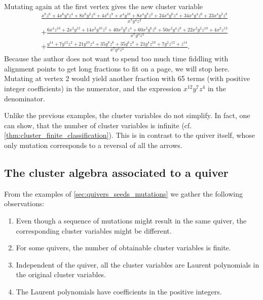 \begin{example}
\begin{align*}
	\end{align*}
	Mutating again at the first vertex gives the new cluster variable
	\begin{align*}
		 & \frac{x^{8} z^{6} + 4 x^{6} y^{4} z^{4} + 8 x^{6} y^{2} z^{6} + 4 x^{6} z^{8} + x^{4} y^{10} + 8 x^{4} y^{8} z^{2} + 24 x^{4} y^{6} z^{4} + 34 x^{4} y^{4} z^{6} + 23 x^{4} y^{2} z^{8}}{x^7y^4z^2} \\&+ \frac{6 x^{4} z^{10} + 2 x^{2} y^{12} + 14 x^{2} y^{10} z^{2} + 40 x^{2} y^{8} z^{4} + 60 x^{2} y^{6} z^{6} + 50 x^{2} y^{4} z^{8} + 22 x^{2} y^{2} z^{10} + 4 x^{2} z^{12}}{x^7 y^4 z^2}\\ &+ \frac{y^{14} + 7 y^{12} z^{2} + 21 y^{10} z^{4} + 35 y^{8} z^{6} + 35 y^{6} z^{8} + 21 y^{4} z^{10} + 7 y^{2} z^{12} + z^{14}}{x^{7} y^{4} z^{2}}.
	\end{align*}
	Because the author does not want to spend too much time fiddling with alignment points
	to get long fractions to fit on a page, we will stop here. Mutating at vertex 2 would
	yield another fraction with 65 terms (with positive integer coefficients) in the
	numerator, and the expression $x^{12}y^7z^4$ in the denominator.

	Unlike the previous examples, the cluster variables do not simplify. In fact, one can
	show, that the number of cluster variables is infinite (cf.
	\cref{thm:cluster_finite_classification}). This is in contrast to the quiver itself,
	whose only mutation corresponds to a reversal of all the arrows.
\end{example}

\subsection{The cluster algebra associated to a quiver}\label{sec:cluster_algebra_from_quiver}

From the examples of \cref{sec:quivers_seeds_mutations} we gather the following
observations:
\begin{enumerate}
	\item Even though a sequence of mutations might result in the same quiver, the corresponding
	      cluster variables might be different.
	\item For some quivers, the number of obtainable cluster variables is finite.
	\item Independent of the quiver, all the cluster variables are Laurent polynomials in the
	      original cluster variables.
	\item The Laurent polynomials have coefficients in the positive integers.
\end{enumerate}

